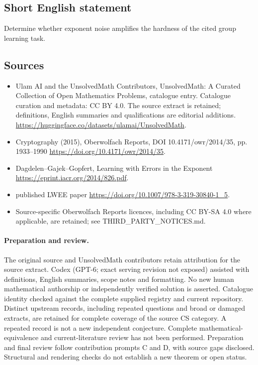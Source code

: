 \documentclass[11pt]{article}
\begin{document}
\subsection{Short English statement}
Determine whether exponent noise amplifies the hardness of the cited group learning task.
\subsection{Sources}
\begin{itemize}
\item[\hypertarget{source:statement:1}{S1}] Ulam AI and the UnsolvedMath Contributors, UnsolvedMath: A Curated Collection of Open Mathematics Problems, catalogue entry. Catalogue curation and metadata: CC BY 4.0. The source extract is retained; definitions, English summaries and qualifications are editorial additions.
\url{https://huggingface.co/datasets/ulamai/UnsolvedMath}.
\item[\hypertarget{source:statement:2}{S2}] Cryptography (2015), Oberwolfach Reports, DOI 10.4171/owr/2014/35, pp. 1933--1990
\url{https://doi.org/10.4171/owr/2014/35}.
\item[\hypertarget{source:statement:3}{S3}] Dagdelen--Gajek--Gopfert, Learning with Errors in the Exponent
\url{https://eprint.iacr.org/2014/826.pdf}.
\item[\hypertarget{source:statement:4}{S4}] published LWEE paper
\url{https://doi.org/10.1007/978-3-319-30840-1_5}.
\item Source-specific Oberwolfach Reports licences, including CC BY-SA 4.0 where applicable, are retained; see THIRD\_PARTY\_NOTICES.md.
\end{itemize}
\paragraph{Preparation and review.}
The original source and UnsolvedMath contributors retain attribution for the source extract. Codex (GPT-6; exact serving revision not exposed) assisted with definitions, English summaries, scope notes and formatting. No new human mathematical authorship or independently verified solution is asserted. Catalogue identity checked against the complete supplied registry and current repository. Distinct upstream records, including repeated questions and broad or damaged extracts, are retained for complete coverage of the source CS category. A repeated record is not a new independent conjecture. Complete mathematical-equivalence and current-literature review has not been performed. Preparation and final review follow contribution prompts C and D, with source gaps disclosed. Structural and rendering checks do not establish a new theorem or open status.
\label{end:statement}
\end{document}
